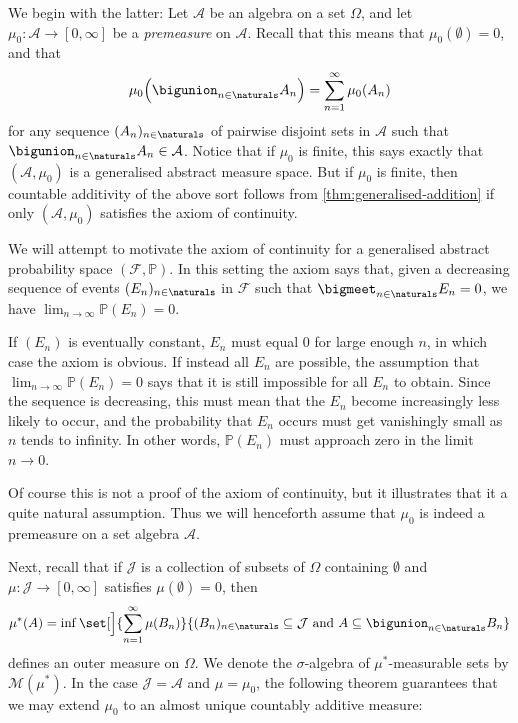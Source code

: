\documentclass[article, a4paper, 11pt, oneside]{memoir}
\numberwithin{equation}{chapter}
\newcommand{\calF}{\mathcal{F}}
\newcommand{\calA}{\mathcal{A}}
\newcommand{\calJ}{\mathcal{J}}
\newcommand{\calM}{\mathcal{M}}
\renewcommand{\P}{\mathbb{P}}
\begin{document}
We begin with the latter: Let $\calA$ be an algebra on a set $\Omega$, and let $\mu_0 \colon \calA \to [0,\infty]$ be a \emph{premeasure} on $\calA$. Recall that this means that $\mu_0(\emptyset) = 0$, and that
%
\begin{equation*}
    \mu_0 \Bigl( \bigunion_{n\in\naturals} A_n \Bigr)
        = \sum_{n=1}^\infty \mu_0(A_n)
\end{equation*}
%
for any sequence $(A_n)_{n\in\naturals}$ of pairwise disjoint sets in $\calA$ such that $\bigunion_{n\in\naturals} A_n \in \calA$. Notice that if $\mu_0$ is finite, this says exactly that $(\calA,\mu_0)$ is a generalised abstract measure space. But if $\mu_0$ is finite, then countable additivity of the above sort follows from \cref{thm:generalised-addition} if only $(\calA,\mu_0)$ satisfies the axiom of continuity.

We will attempt to motivate the axiom of continuity for a generalised abstract probability space $(\calF, \P)$. In this setting the axiom says that, given a decreasing sequence of events $(E_n)_{n\in\naturals}$ in $\calF$ such that $\bigmeet_{n\in\naturals} E_n = 0$, we have $\lim_{n\to\infty} \P(E_n) = 0$.

If $(E_n)$ is eventually constant, $E_n$ must equal $0$ for large enough $n$, in which case the axiom is obvious. If instead all $E_n$ are possible, the assumption that $\lim_{n\to\infty} \P(E_n) = 0$ says that it is still impossible for all $E_n$ to obtain. Since the sequence is decreasing, this must mean that the $E_n$ become increasingly less likely to occur, and the probability that $E_n$ occurs must get vanishingly small as $n$ tends to infinity. In other words, $\P(E_n)$ must approach zero in the limit $n \to 0$.

Of course this is not a proof of the axiom of continuity, but it illustrates that it a quite natural assumption. Thus we will henceforth assume that $\mu_0$ is indeed a premeasure on a set algebra $\calA$.

Next, recall that if $\calJ$ is a collection of subsets of $\Omega$ containing $\emptyset$ and $\mu \colon \calJ \to [0,\infty]$ satisfies $\mu(\emptyset) = 0$, then
%
\begin{equation}
    \label{eq:outer-measure}
    \mu^*(A)
        = \inf \set[\Big]{
            \sum_{n=1}^\infty \mu(B_n)
        }{
            (B_n)_{n \in \naturals} \subseteq \calJ
            \text{ and }
            A \subseteq \bigunion_{n \in \naturals} B_n
        }
\end{equation}
%
defines an outer measure on $\Omega$. We denote the $\sigma$-algebra of $\mu^*$-measurable sets by $\calM(\mu^*)$. In the case $\calJ = \calA$ and $\mu = \mu_0$, the following theorem guarantees that we may extend $\mu_0$ to an almost unique countably additive measure:
\end{document}
